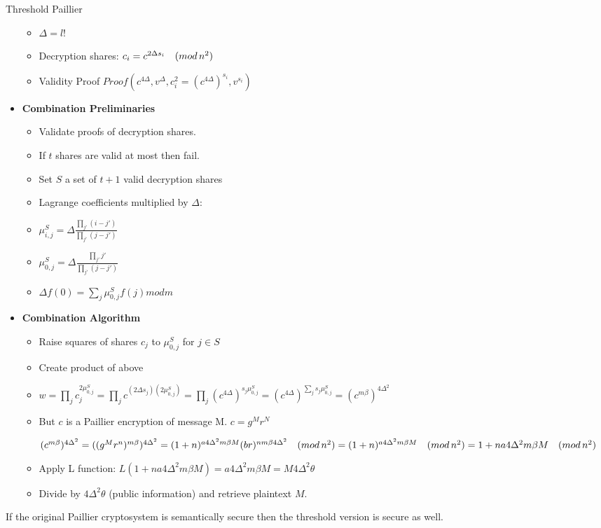 \documentclass{beamer}
\begin{document}
\begin{frame}[allowframebreaks]{Threshold Paillier \cite{fouque2001sharing}}
\begin{itemize}
\begin{itemize}
\item $\Delta = l!$
\item Decryption shares: $c_i = c^{2  \Delta  s_i} \quad (mod \, {n^2})$
\item Validity Proof $Proof( c^{4  \Delta}, v^\Delta, c_i^2 = (c^{4  \Delta})^{s_i}   , v^{s_i})$
\end{itemize}
\framebreak
\item \textbf{Combination Preliminaries}
\begin{itemize}
\item Validate proofs of decryption shares.
\item If $t$ shares are valid at most then fail.
\item Set $S$ a set of $t+1$ valid decryption shares
\item Lagrange coefficients multiplied by $\Delta$: 
\item $\mu^S_{i,j} = \Delta \frac{\prod_{j'} (i-j')}{\prod_{j'} (j-j')}$
\item $\mu^S_{0,j} = \Delta  \frac{\prod_{j'} j'}{\prod_{j'} (j-j')}$
\item $\Delta  f(0) = \sum_{j} \mu^S_{0,j}  f(j) mod m$
\end{itemize}
\framebreak
\item \textbf{Combination Algorithm}
\begin{itemize}
\item Raise squares of shares $c_j$ to $\mu^S_{0,j}$ for $j \in S$ 
\item Create product of above 
\item 
\begin{center}
$ 
 w = \prod_j c_j^{2  \mu^S_{0,j}}    
   = \prod_j c^{(2  \Delta  s_j)  (2  \mu^S_{0,j}) }  
   = \prod_j (c^{4  \Delta})^{s_j  \mu^S_{0,j}}  
   = (c^{4  \Delta})^{\sum_j s_j  \mu^S_{0,j}}  
   = (c^{m  \beta})^{4  \Delta^2} 
$
\end{center}
\item But $c$ is a Paillier encryption of message M. $c = g^M  r^N$
\begin{center} 
$
(c^{m  \beta})^{4  \Delta^2} = ((g^M  r^n)^{m  \beta})^{4  \Delta^2} =  
(1+n)^{a  4  \Delta^2  m  \beta  M}  (b  r) ^ {n  m  \beta  4  \Delta^2} \quad (mod \, {n^2}) =   
(1+n)^{a  4  \Delta^2  m  \beta  M} \quad (mod \, {n^2}) =  
 1+n  a  4  \Delta^2  m  \beta  M  \quad (mod \, {n^2})
$
\end{center}
\item Apply L function: $L(1+n  a  4  \Delta^2  m  \beta  M) = a  4  \Delta^2  m  \beta  M = M  4  \Delta^2  \theta$

\item Divide by $4  \Delta^2  \theta$ (public information) and retrieve plaintext $M$.
\end{itemize}
\end{itemize}

\begin{theorem}
If the original Paillier cryptosystem is semantically secure then the threshold version is secure as well.
\end{theorem}

\end{frame}
\end{document}
